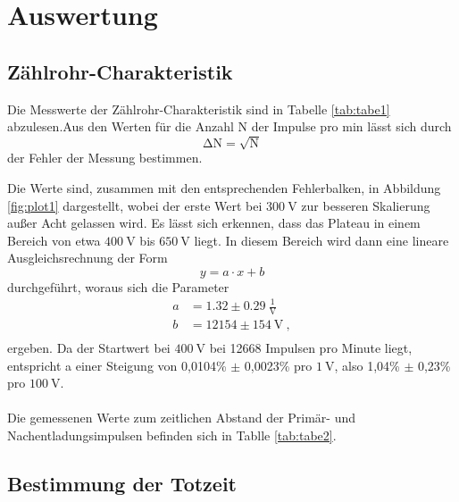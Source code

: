 \section{Auswertung}
\subsection{Zählrohr-Charakteristik}
Die Messwerte der Zählrohr-Charakteristik sind in Tabelle \ref{tab:tabe1}
abzulesen.Aus den Werten für die Anzahl N der Impulse pro min lässt sich durch
\begin{equation}
  \increment\text{N}=\sqrt{\text{N}}
\end{equation}
der Fehler der Messung bestimmen.

Die Werte sind, zusammen mit den entsprechenden Fehlerbalken, in Abbildung \ref{fig:plot1}
dargestellt, wobei der erste Wert bei $\SI{300}{\volt}$ zur besseren Skalierung
außer Acht gelassen wird.
Es lässt sich erkennen, dass das Plateau in einem Bereich von etwa $\SI{400}{\volt}$
bis $\SI{650}{\volt}$ liegt. In diesem Bereich wird dann eine lineare Ausgleichsrechnung
der Form
\begin{equation}
  y = a\cdot x +b
  \label{eqn:linear}
\end{equation}
durchgeführt, woraus sich die Parameter
\begin{align*}
  a &= 1.32 \pm 0.29 \: \frac{1}{\text{V}}\\
  b &= 12154 \pm 154 \: \text{V}\: ,\\
\end{align*}
ergeben.
Da der Startwert bei $\SI{400}{\volt}$ bei 12668 Impulsen pro Minute liegt,
entspricht a einer Steigung von 0,0104\% $\pm$ 0,0023\% pro $\SI{1}{\volt}$,
also 1,04\% $\pm$ 0,23\% pro $\SI{100}{\volt}$. \\
\\
Die gemessenen Werte zum zeitlichen Abstand der Primär- und Nachentladungsimpulsen
befinden sich in Tablle \ref{tab:tabe2}.


\subsection{Bestimmung der Totzeit}

